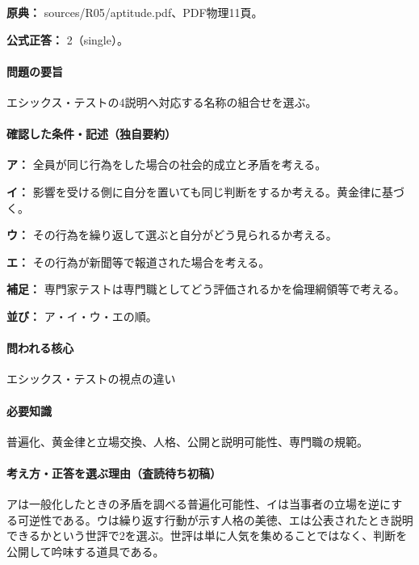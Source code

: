 \noindent\textbf{原典：} sources/R05/aptitude.pdf、PDF物理11頁。

\textbf{公式正答：} 2（single）。

\paragraph{問題の要旨} エシックス・テストの4説明へ対応する名称の組合せを選ぶ。

\paragraph{確認した条件・記述（独自要約）}\mbox{}\par

\noindent\textbf{ア：} 全員が同じ行為をした場合の社会的成立と矛盾を考える。\par

\noindent\textbf{イ：} 影響を受ける側に自分を置いても同じ判断をするか考える。黄金律に基づく。\par

\noindent\textbf{ウ：} その行為を繰り返して選ぶと自分がどう見られるか考える。\par

\noindent\textbf{エ：} その行為が新聞等で報道された場合を考える。\par

\noindent\textbf{補足：} 専門家テストは専門職としてどう評価されるかを倫理綱領等で考える。\par

\noindent\textbf{並び：} ア・イ・ウ・エの順。\par

\paragraph{問われる核心} エシックス・テストの視点の違い

\paragraph{必要知識} 普遍化、黄金律と立場交換、人格、公開と説明可能性、専門職の規範。

\paragraph{考え方・正答を選ぶ理由（査読待ち初稿）} アは一般化したときの矛盾を調べる普遍化可能性、イは当事者の立場を逆にする可逆性である。ウは繰り返す行動が示す人格の美徳、エは公表されたとき説明できるかという世評で2を選ぶ。世評は単に人気を集めることではなく、判断を公開して吟味する道具である。

